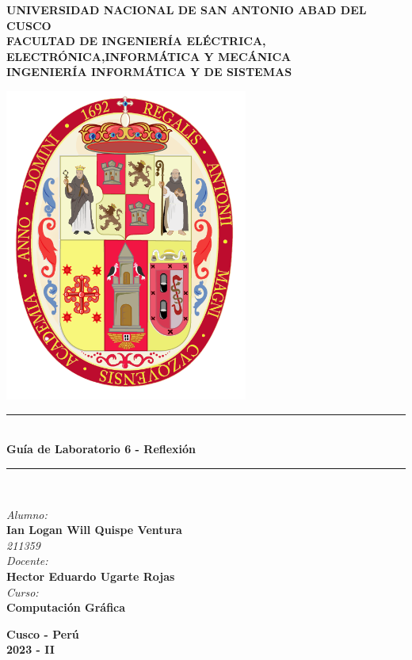 \documentclass[a4paper]{article}
\begin{document}
\begin{titlepage}

\newcommand{\linea}{\rule{\linewidth}{0.7mm}} 
\center
\textbf{\Large UNIVERSIDAD NACIONAL DE SAN ANTONIO ABAD DEL CUSCO}\\[0.2cm]
\textbf{\Large FACULTAD DE INGENIERÍA ELÉCTRICA, ELECTRÓNICA,INFORMÁTICA Y MECÁNICA}\\[0.2cm]
\textbf{\Large INGENIERÍA INFORMÁTICA Y DE SISTEMAS\\[0.6cm]}

\includegraphics[width=8cm]{src/escudo-unsaac.png}
\vfill

\linea
\\[0.3cm]
\textbf{\LARGE Guía de Laboratorio 6 - Reflexión}\\[0.2cm]
\linea \\
\vfill

\textit{\Large Alumno:}\\
    \textbf{\large Ian Logan Will Quispe Ventura}\\
    \textit{211359}\\

\vspace{0.3cm}
    \textit{\Large Docente:}\\
    \textbf{\large Hector Eduardo Ugarte Rojas}\\
\vspace{0.5cm}
    \textit{\Large Curso:}\\
    \textbf{\large Computación Gráfica}\\
    \vfill

\vspace{0.4cm}
    \textbf{\Large Cusco - Perú }\\
    \textbf{\large 2023 - II }\\
    \newpage
    \end{titlepage}
\end{document}
